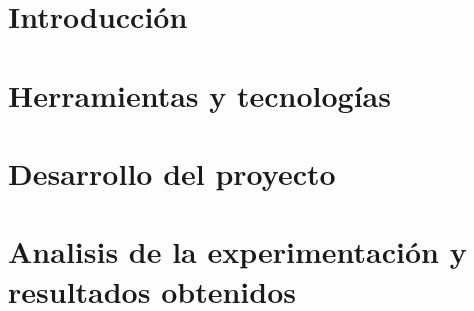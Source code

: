 \documentclass[spanish,a4paper,12pt,twoside,openright]{extreport}
\begin{document}
\listoftables

\newpage{\pagestyle{empty}}

\newpage
\thispagestyle{empty}

\renewcommand{\thepage}{\arabic{page}}
\setcounter{page}{1}
\pagestyle{plain}

\chapter{\LARGE Introducción}
\label{chapter:introduction}





\newpage{\pagestyle{empty}}
\thispagestyle{empty}

\chapter{\LARGE Herramientas y tecnologías}
\label{chapter:toolsAndTechnologies}






\newpage{\pagestyle{empty}}
\thispagestyle{empty}

\chapter{\LARGE Desarrollo del proyecto}
\label{chapter:projectDevelopment}






\newpage{\pagestyle{empty}}
\thispagestyle{empty}

\chapter{\LARGE Analisis de la experimentación y resultados obtenidos}
\label{chapter:analysisTestAndResults}
\end{document}
